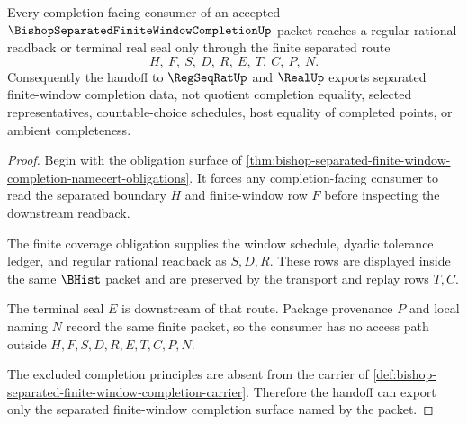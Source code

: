 \begin{theorem}
\label{thm:bishop-separated-finite-window-completion-handoff}
Every completion-facing consumer of an accepted $\BishopSeparatedFiniteWindowCompletionUp$ packet reaches a regular rational readback or terminal real seal only through the finite separated route
$$
H,\ F,\ S,\ D,\ R,\ E,\ T,\ C,\ P,\ N .
$$
Consequently the handoff to $\RegSeqRatUp$ and $\RealUp$ exports separated finite-window completion data, not quotient completion equality, selected representatives, countable-choice schedules, host equality of completed points, or ambient completeness.
\end{theorem}
\begin{proof}
Begin with the obligation surface of \autoref{thm:bishop-separated-finite-window-completion-namecert-obligations}. It forces any completion-facing consumer to read the separated boundary $H$ and finite-window row $F$ before inspecting the downstream readback.

The finite coverage obligation supplies the window schedule, dyadic tolerance ledger, and regular rational readback as $S,D,R$. These rows are displayed inside the same $\BHist$ packet and are preserved by the transport and replay rows $T,C$.

The terminal seal $E$ is downstream of that route. Package provenance $P$ and local naming $N$ record the same finite packet, so the consumer has no access path outside $H,F,S,D,R,E,T,C,P,N$.

The excluded completion principles are absent from the carrier of \autoref{def:bishop-separated-finite-window-completion-carrier}. Therefore the handoff can export only the separated finite-window completion surface named by the packet.
\end{proof}


